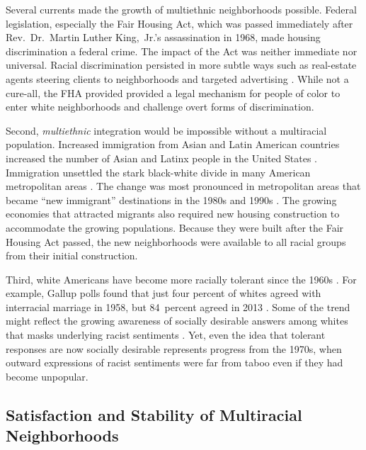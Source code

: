 \documentclass{baderart}
\renewcommand{\needcite}[1][]{%
	\strong{[CITE: %
		\ifthenelse{\equal{#1}{}}{}{: #1}	%
	]}}
\begin{document}
Several currents made the growth of multiethnic neighborhoods possible. Federal legislation, especially the Fair Housing Act, which was passed immediately after Rev.~Dr.~Martin Luther King,~Jr.'s assassination in 1968, made housing discrimination a federal crime. The impact of the Act was neither immediate nor universal. Racial discrimination persisted in more subtle ways such as real-estate agents steering clients to neighborhoods and targeted advertising \citep{ross_housing_2005, roscigno_complexities_2009}. While not a cure-all, the FHA provided provided a legal mechanism for people of color to enter white neighborhoods and challenge overt forms of discrimination. 

Second, \emph{multiethnic} integration would be impossible without a multiracial population. Increased immigration from Asian and Latin American countries increased the number of Asian and Latinx people in the United States \citep{denton_patterns_1991, frey_latino_1996, singer_rise_2001}. Immigration unsettled the stark black-white divide in many American metropolitan areas \citep{alba_neighborhood_1995, logan_segregation_2004, friedman_declines_2008}. The change was most pronounced in metropolitan areas that became ``new immigrant'' destinations in the 1980s and 1990s \citep{singer_rise_2001, lichter_immigrant_2009}. The growing economies that attracted migrants also required new housing construction to accommodate the growing populations. Because they were built after the Fair Housing Act passed, the new neighborhoods were available to all racial groups from their initial construction. 

Third, white Americans have become more racially tolerant since the 1960s \citep{schuman_racial_1997}. For example, Gallup polls found that just four percent of whites agreed with interracial marriage in 1958, but 84~percent agreed in 2013 \citep{newport_u.s._2013}. 
Some of the trend might reflect the growing awareness of socially desirable answers among whites that masks underlying racist sentiments \citep{jackman_education_1984, bonilla-silva_racism_2003}. Yet, even the idea that tolerant responses are now socially desirable represents progress from the 1970s, when outward expressions of racist sentiments were far from taboo even if they had become unpopular.

\subsection{Satisfaction and Stability of Multiracial Neighborhoods}\label{sec:satisfaction-stability}
\end{document}
